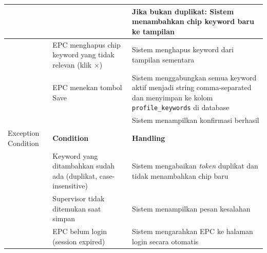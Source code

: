 \begin{longtable}{|p{3.5cm}|p{4.5cm}|p{5cm}|}
\hline
 & & Jika bukan duplikat: Sistem menambahkan chip keyword baru ke tampilan \\
\hline
 & EPC menghapus chip keyword yang tidak relevan (klik $\times$) & Sistem menghapus keyword dari tampilan sementara \\
\hline
 & EPC menekan tombol Save & Sistem menggabungkan semua keyword aktif menjadi string comma-separated dan menyimpan ke kolom \texttt{profile\_keywords} di database \\
\hline
 & & Sistem menampilkan konfirmasi berhasil \\
\hline
Exception Condition & \textbf{Condition} & \textbf{Handling} \\
\hline
 & Keyword yang ditambahkan sudah ada (duplikat, case-insensitive) & Sistem mengabaikan \textit{token} duplikat dan tidak menambahkan chip baru \\
\hline
 & Supervisor tidak ditemukan saat simpan & Sistem menampilkan pesan kesalahan \\
\hline
 & EPC belum login (session expired) & Sistem mengarahkan EPC ke halaman login secara otomatis \\
\hline
\end{longtable}

